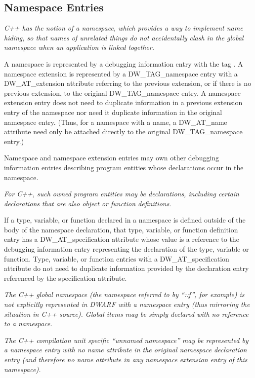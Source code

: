 \subsection{Namespace Entries}
\label{chap:namespaceentries}
\textit{C++ has the notion of a namespace, which provides a way to
implement name hiding, so that names of unrelated things
do not accidentally clash in the global namespace when an
application is linked together.}

A namespace is represented by a debugging information entry
with the 
tag . 
A namespace extension is
represented by a DW\-\_TAG\-\_namespace entry 
with a DW\-\_AT\-\_extension
attribute referring to the previous extension, or if there
is no previous extension, to the original 
DW\-\_TAG\-\_namespace
entry. A namespace extension entry does not need to duplicate
information in a previous extension entry of the namespace
nor need it duplicate information in the original namespace
entry. (Thus, for a namespace with a name, 
a DW\_AT\_name
attribute need only be attached directly to the original
DW\-\_TAG\-\_namespace entry.)

Namespace and namespace extension entries may own other
debugging information entries describing program entities
whose declarations occur in the namespace.

\textit{For C++, such owned program entities may be declarations,
including certain declarations that are also object or
function definitions.}

If a type, variable, or function declared in a namespace is
defined outside of the body of the namespace declaration,
that type, variable, or function definition entry has a
DW\-\_AT\-\_specification attribute whose value is a reference to the
debugging information entry representing the declaration of
the type, variable or function. Type, variable, or function
entries with a DW\-\_AT\-\_specification attribute do not need
to duplicate information provided by the declaration entry
referenced by the specification attribute.

\textit{The C++ global namespace (the namespace referred to by
``::f'', for example) is not explicitly represented in
DWARF with a namespace entry (thus mirroring the situation
in C++ source).  Global items may be simply declared with no
reference to a namespace.}

\textit{The C++ compilation unit specific ``unnamed namespace'' may
be represented by a namespace entry with no name attribute in
the original namespace declaration entry (and therefore no name
attribute in any namespace extension entry of this namespace).
}

